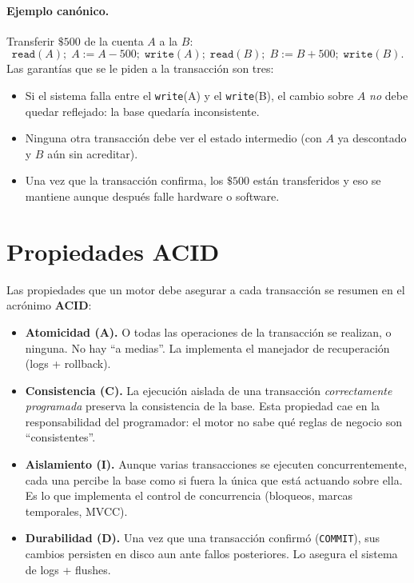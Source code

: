 \documentclass[11pt,a4paper]{article}
\begin{document}
\paragraph{Ejemplo canónico.} Transferir $\$500$ de la cuenta $A$ a la $B$:
\[
\texttt{read}(A);\; A := A - 500;\; \texttt{write}(A);\;
\texttt{read}(B);\; B := B + 500;\; \texttt{write}(B).
\]
Las garantías que se le piden a la transacción son tres:

\begin{itemize}
    \item Si el sistema falla entre el \texttt{write}(A) y el
    \texttt{write}(B), el cambio sobre $A$ \emph{no} debe quedar
    reflejado: la base quedaría inconsistente.
    \item Ninguna otra transacción debe ver el estado intermedio (con $A$
    ya descontado y $B$ aún sin acreditar).
    \item Una vez que la transacción confirma, los $\$500$ están
    transferidos y eso se mantiene aunque después falle hardware o
    software.
\end{itemize}

\section{Propiedades ACID}

Las propiedades que un motor debe asegurar a cada transacción se
resumen en el acrónimo \textbf{ACID}:

\begin{itemize}
    \item \textbf{Atomicidad (A).} O todas las operaciones de la transacción
    se realizan, o ninguna. No hay ``a medias''. La implementa el manejador
    de recuperación (logs + rollback).
    \item \textbf{Consistencia (C).} La ejecución aislada de una transacción
    \emph{correctamente programada} preserva la consistencia de la base.
    Esta propiedad cae en la responsabilidad del programador: el motor
    no sabe qué reglas de negocio son ``consistentes''.
    \item \textbf{Aislamiento (I).} Aunque varias transacciones se ejecuten
    concurrentemente, cada una percibe la base como si fuera la única que
    está actuando sobre ella. Es lo que implementa el control de
    concurrencia (bloqueos, marcas temporales, MVCC).
    \item \textbf{Durabilidad (D).} Una vez que una transacción confirmó
    (\texttt{COMMIT}), sus cambios persisten en disco aun ante fallos
    posteriores. Lo asegura el sistema de logs + flushes.
\end{itemize}
\end{document}
